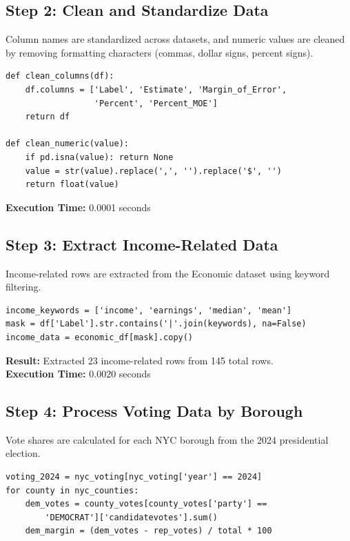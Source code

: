 \documentclass[11pt,a4paper]{article}
\begin{document}
\subsection{Step 2: Clean and Standardize Data}

Column names are standardized across datasets, and numeric values are cleaned by removing formatting characters (commas, dollar signs, percent signs).

\begin{verbatim}
def clean_columns(df):
    df.columns = ['Label', 'Estimate', 'Margin_of_Error', 
                  'Percent', 'Percent_MOE']
    return df

def clean_numeric(value):
    if pd.isna(value): return None
    value = str(value).replace(',', '').replace('$', '')
    return float(value)
\end{verbatim}

\textbf{Execution Time:} 0.0001 seconds

\subsection{Step 3: Extract Income-Related Data}

Income-related rows are extracted from the Economic dataset using keyword filtering.

\begin{verbatim}
income_keywords = ['income', 'earnings', 'median', 'mean']
mask = df['Label'].str.contains('|'.join(keywords), na=False)
income_data = economic_df[mask].copy()
\end{verbatim}

\textbf{Result:} Extracted 23 income-related rows from 145 total rows.\\
\textbf{Execution Time:} 0.0020 seconds

\subsection{Step 4: Process Voting Data by Borough}

Vote shares are calculated for each NYC borough from the 2024 presidential election.

\begin{verbatim}
voting_2024 = nyc_voting[nyc_voting['year'] == 2024]
for county in nyc_counties:
    dem_votes = county_votes[county_votes['party'] == 
        'DEMOCRAT']['candidatevotes'].sum()
    dem_margin = (dem_votes - rep_votes) / total * 100
\end{verbatim}
\end{document}
